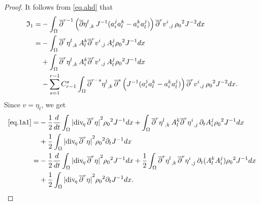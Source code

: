 \documentclass[12pt,twoside,reqno]{amsart}
\numberwithin{equation}{section}
\theoremstyle{definition}
\theoremstyle{remark}
\begin{document}
\begin{proof}
It follows from \eqref{eq.ahd} that
\begin{align}
  {\mathfrak{I}}_1=&-\int_\Omega {\overline{\partial}}^{r-1} \left({\overline{\partial}} {{{\eta^l}}_{,{k}}\,}J^{-1}(a^j_ia^k_l-a^k_ia^j_l)\right){{{{\overline{\partial}}^r v^i}}_{,{j}}\,}{\rho_0}^2  J^{-2}dx{\nonumber}\\
  =&-\int_\Omega{\overline{\partial}}^r {{{\eta^l}}_{,{k}}\,} A^k_l{{{{\overline{\partial}}^r v^i}}_{,{j}}\,}A^j_i{\rho_0}^2  J^{-1}dx\label{eq.1a1}\\
  &+\int_\Omega {\overline{\partial}}^r {{{\eta^l}}_{,{k}}\,}A^k_i{{{{\overline{\partial}}^r v^i}}_{,{j}}\,}A^j_l{\rho_0}^2  J^{-1}dx \label{eq.1b1}\\
  &-\sum_{s=1}^{r-1} C_{r-1}^s\int_\Omega {\overline{\partial}}^{r-s}{{{\eta^l}}_{,{k}}\,}{\overline{\partial}}^s\left(J^{-1}(a^j_ia^k_l-a^k_ia^j_l)\right){{{{\overline{\partial}}^r v^i}}_{,{j}}\,}{\rho_0}^2  J^{-2}dx. \label{eq.1c1}
\end{align}
Since $v=\eta_t$, we get
\begin{align*}
  \eqref{eq.1a1}=&-\frac{1}{2}\frac{d}{dt}\int_\Omega{\vert{{\mathrm{div}_{\!\eta}\,}{\overline{\partial}}^r \eta}\vert}^2{\rho_0}^2  J^{-1}dx+\int_\Omega{\overline{\partial}}^r {{{\eta^l}}_{,{k}}\,} A^k_l{{{{\overline{\partial}}^r \eta^i}}_{,{j}}\,}{\partial}_t A^j_i{\rho_0}^2 J^{-1}dx\\
  &+\frac{1}{2}\int_\Omega {\vert{{\mathrm{div}_{\!\eta}\,}{\overline{\partial}}^r \eta}\vert}^2{\rho_0}^2  {\partial}_tJ^{-1}dx\\
  =&-\frac{1}{2}\frac{d}{dt}\int_\Omega{\vert{{\mathrm{div}_{\!\eta}\,}{\overline{\partial}}^r \eta}\vert}^2{\rho_0}^2  J^{-1}dx+\frac{1}{2}\int_\Omega{\overline{\partial}}^r {{{\eta^l}}_{,{k}}\,}{{{{\overline{\partial}}^r \eta^i}}_{,{j}}\,}{\partial}_t (A^k_l A^j_i){\rho_0}^2  J^{-1}dx\\
  &+\frac{1}{2}\int_\Omega {\vert{{\mathrm{div}_{\!\eta}\,}{\overline{\partial}}^r \eta}\vert}^2{\rho_0}^2  {\partial}_tJ^{-1}dx.
\end{align*}


\end{proof}
\end{document}
